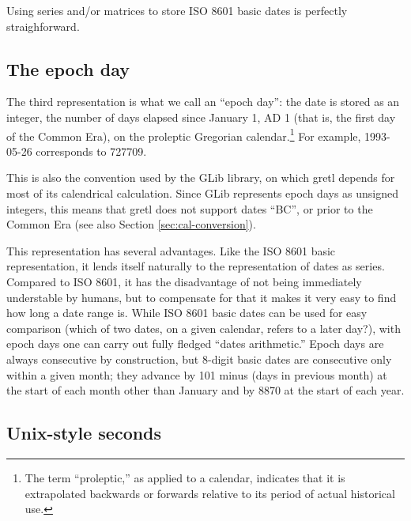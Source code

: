 Using series and/or matrices to store ISO 8601 basic dates is
perfectly straighforward.

\subsection{The epoch day}
\label{sec:cal-epochday}

The third representation is what we call an ``epoch day'': the date is
stored as an integer, the number of days elapsed since January 1, AD 1
(that is, the first day of the Common Era), on the proleptic Gregorian
calendar.\footnote{The term ``proleptic,'' as applied to a calendar,
  indicates that it is extrapolated backwards or forwards relative to
  its period of actual historical use.} For example, 1993-05-26
corresponds to 727709.

This is also the convention used by the \textsf{GLib} library, on
which gretl depends for most of its calendrical calculation. Since
\textsf{GLib} represents epoch days as unsigned integers, this means
that gretl does not support dates ``BC'', or prior to the Common Era
(see also Section \ref{sec:cal-conversion}).

This representation has several advantages. Like the ISO 8601 basic
representation, it lends itself naturally to the representation of
dates as series. Compared to ISO 8601, it has the disadvantage of not
being immediately understable by humans, but to compensate for that it
makes it very easy to find how long a date range is. While ISO 8601
basic dates can be used for easy comparison (which of two dates, on a
given calendar, refers to a later day?), with epoch days one can carry
out fully fledged ``dates arithmetic.''  Epoch days are always
consecutive by construction, but 8-digit basic dates are consecutive
only within a given month; they advance by 101 minus (days in previous
month) at the start of each month other than January and by 8870 at
the start of each year.


\subsection{Unix-style seconds}
\label{sec:cal-seconds}

